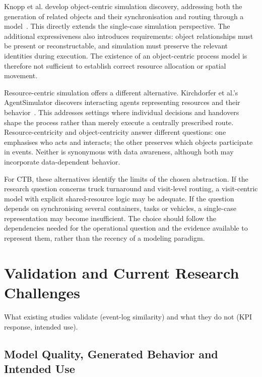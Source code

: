 Knopp et al. develop object-centric simulation discovery, addressing both the generation of related objects and their synchronisation and routing through a model~\cite{Knopp2023ObjectCentricSimulation}. This directly extends the single-case simulation perspective. The additional expressiveness also introduces requirements: object relationships must be present or reconstructable, and simulation must preserve the relevant identities during execution. The existence of an object-centric process model is therefore not sufficient to establish correct resource allocation or spatial movement.

Resource-centric simulation offers a different alternative. Kirchdorfer et al.'s AgentSimulator discovers interacting agents representing resources and their behavior~\cite{RWKirchdorfer2025Agents}. This addresses settings where individual decisions and handovers shape the process rather than merely execute a centrally prescribed route. Resource-centricity and object-centricity answer different questions: one emphasises who acts and interacts; the other preserves which objects participate in events. Neither is synonymous with data awareness, although both may incorporate data-dependent behavior.

For CTB, these alternatives identify the limits of the chosen abstraction. If the research question concerns truck turnaround and visit-level routing, a visit-centric model with explicit shared-resource logic may be adequate. If the question depends on synchronising several containers, tasks or vehicles, a single-case representation may become insufficient. The choice should follow the dependencies needed for the operational question and the evidence available to represent them, rather than the recency of a modeling paradigm.

\section{Validation and Current Research Challenges}
\label{sec:rw_validation}
\begin{hints}
\item What existing studies validate (event-log similarity) and what they do not (KPI response, intended use).
\end{hints}

\subsection{Model Quality, Generated Behavior and Intended Use}

